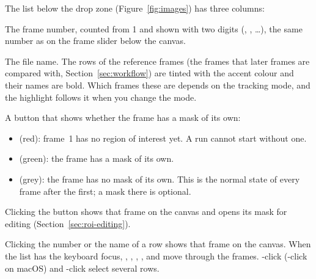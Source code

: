 The list below the drop zone (Figure~\ref{fig:images}) has three columns:
\begin{description}[leftmargin=1.2cm,style=nextline]
  \item[\#] The frame number, counted from 1 and shown with two digits (, ,
    \ldots), the same number as on the frame slider below the canvas.
  \item[Filename] The file name. The rows of the reference frames (the frames that later frames
    are compared with, Section~\ref{sec:workflow}) are tinted with the accent colour and their
    names are bold. Which frames these are depends on the tracking mode, and the highlight
    follows it when you change the mode.
  \item[Region] A button that shows whether the frame has a mask of its own:
    \begin{itemize}
      \item \textcolor{raftred}{} (red): frame~1 has no region of interest yet. A run
            cannot start without one.
      \item \textcolor{raftgreen}{} (green): the frame has a mask of its own.
      \item {} (grey): the frame has no mask of its own. This is the normal state of every
            frame after the first; a mask there is optional.
    \end{itemize}
    Clicking the button shows that frame on the canvas and opens its mask for editing
    (Section~\ref{sec:roi-editing}).
\end{description}

Clicking the number or the name of a row shows that frame on the canvas. When the list has the
keyboard focus, , , , ,  and 
move through the frames. -click (-click on macOS) and -click
select several rows.

